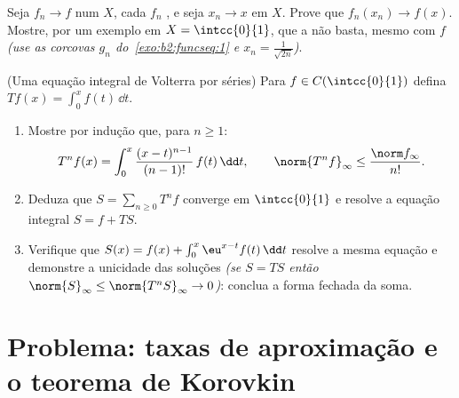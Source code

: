 \begin{exercise}[$\star\star$]\label{exo:b2:funcseq:11}
Seja $f_n \to f$  num  $X$, cada $f_n$
, e seja $x_n \to x$ em $X$. Prove que $f_n(x_n) \to
f(x)$. Mostre, por um exemplo em $X = \intcc{0}{1}$, que a  não basta, mesmo com $f$ 
\emph{(use as corcovas $g_n$ do~\cref{exo:b2:funcseq:1} e $x_n =
\frac{1}{\sqrt{2n}}$)}.
\end{exercise}

\begin{exercise}[$\star\star\star$]\label{exo:b2:funcseq:12}
(Uma equação integral de Volterra por séries) Para $f \in
C(\intcc{0}{1})$ defina $Tf(x) = \int_0^x f(t)\,\dd t$.
\begin{enumerate}
  \item Mostre por indução que, para $n \geq 1$:
        \[
        T^n f(x) = \int_0^x \frac{(x -
        t)^{n-1}}{(n-1)!}\,f(t)\,\dd t,
        \qquad
        \norm{T^n f}_\infty \leq \frac{\norm f_\infty}{n!} .
        \]
  \item Deduza que $S = \sum_{n\geq0} T^n f$ converge 
        em $\intcc{0}{1}$ e resolve a equação integral $S = f
        + TS$.
  \item Verifique que $S(x) = f(x) + \int_0^x \eu^{x-t}f(t)\,\dd
        t$ resolve a mesma equação e demonstre a unicidade das
        soluções  \emph{(se $S = TS$ então
        $\norm{S}_\infty \leq \norm{T^nS}_\infty \to 0$)}:
        conclua a forma fechada da soma.
\end{enumerate}
\end{exercise}

\section{Problema: taxas de aproximação e o teorema de Korovkin}

